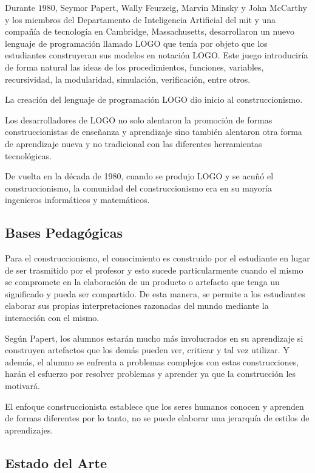 Durante $1980$, Seymor Papert, Wally Feurzeig, Marvin Minsky y John McCarthy y los
miembros del Departamento de Inteligencia Artificial del \Gls{mit} y una
compañía de tecnología en Cambridge, Massachusetts, desarrollaron un nuevo
lenguaje de programación llamado LOGO que tenía por objeto que los estudiantes
construyeran sus modelos en notación LOGO\@. Este juego introduciría de forma
natural las ideas de los procedimientos, funciones, variables, recursividad, la
modularidad, simulación, verificación, entre otros.

La creación del lenguaje de programación LOGO dio inicio al construccionismo.

Los desarrolladores de LOGO no solo alentaron la promoción de formas
construccionistas de enseñanza y aprendizaje sino también alentaron otra forma
de aprendizaje nueva y no tradicional con las diferentes herramientas tecnológicas. 

De vuelta en la década de 1980, cuando se produjo LOGO y se acuñó el
construccionismo, la comunidad del construccionismo era en su mayoría  ingenieros
informáticos y matemáticos\cite{historia:2014}.

\subsection{Bases Pedagógicas}

Para el construccionismo, el conocimiento es construido por el estudiante en
lugar de ser trasmitido por el profesor\cite{moses:2003} y esto sucede
particularmente cuando el mismo se compromete en la elaboración de un producto o
artefacto que tenga un significado y pueda ser compartido\cite{valdivia:sg}. De
esta manera, se permite a los estudiantes elaborar sus propias interpretaciones
razonadas del mundo mediante la interacción con el mismo.

Según Papert, los alumnos estarán mucho más involucrados en su aprendizaje si
construyen artefactos que los demás pueden ver, criticar y tal vez utilizar. Y
además, el alumno se enfrenta a problemas complejos con estas construcciones,
harán el esfuerzo por resolver problemas y aprender ya que la construcción les
motivará\cite{const:vs}.

El enfoque construccionista establece que los seres humanos conocen y aprenden
de formas diferentes por lo tanto, no se puede elaborar una jerarquía de estilos
de aprendizajes\cite{valdivia:sg}.

\subsection{Estado del Arte}

